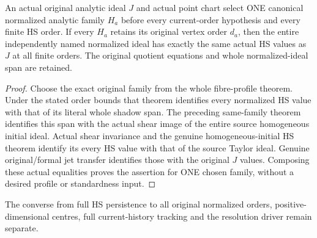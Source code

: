 \begin{theorem}
\label{hir:actual-original-point-order-retention-entire-hs}
\leanok
An actual original analytic ideal $J$ and actual point chart select
ONE canonical normalized analytic family $H_a$ before every
current-order hypothesis and every finite HS order. If every $H_a$
retains its original vertex order $d_a$, then the entire independently
named normalized ideal has exactly the same actual HS values as $J$
at all finite orders. The original quotient equations and whole
normalized-ideal span are retained.
\end{theorem}
\begin{proof}
Choose the exact original family from the whole fibre-profile theorem.
Under the stated order bounds that theorem identifies every normalized
HS value with that of its literal whole shadow span. The preceding
same-family theorem identifies this span with the actual shear image
of the entire source homogeneous initial ideal. Actual shear
invariance and the genuine homogeneous-initial HS theorem identify
its every HS value with that of the source Taylor ideal. Genuine
original/formal jet transfer identifies those with the original $J$
values. Composing these actual equalities proves the assertion for
ONE chosen family, without a desired profile or standardness input.
\end{proof}

The converse from full HS persistence to all original normalized orders,
positive-dimensional centres, full current-history tracking and the
resolution driver remain separate.
